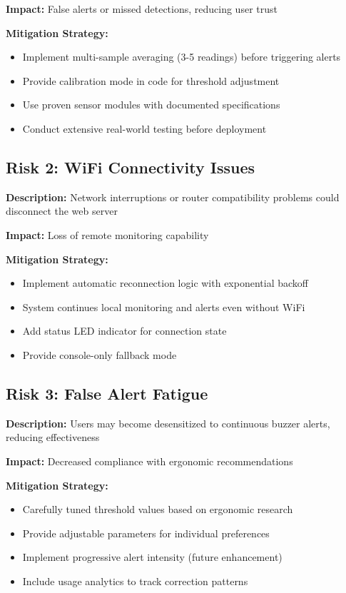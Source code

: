 \documentclass[12pt,a4paper]{article}
\begin{document}
\textbf{Impact:} False alerts or missed detections, reducing user trust

\textbf{Mitigation Strategy:}
\begin{itemize}
\item Implement multi-sample averaging (3-5 readings) before triggering alerts
\item Provide calibration mode in code for threshold adjustment
\item Use proven sensor modules with documented specifications
\item Conduct extensive real-world testing before deployment
\end{itemize}

\subsection{Risk 2: WiFi Connectivity Issues}

\textbf{Description:} Network interruptions or router compatibility problems could disconnect the web server

\textbf{Impact:} Loss of remote monitoring capability

\textbf{Mitigation Strategy:}
\begin{itemize}
\item Implement automatic reconnection logic with exponential backoff
\item System continues local monitoring and alerts even without WiFi
\item Add status LED indicator for connection state
\item Provide console-only fallback mode
\end{itemize}

\subsection{Risk 3: False Alert Fatigue}

\textbf{Description:} Users may become desensitized to continuous buzzer alerts, reducing effectiveness

\textbf{Impact:} Decreased compliance with ergonomic recommendations

\textbf{Mitigation Strategy:}
\begin{itemize}
\item Carefully tuned threshold values based on ergonomic research
\item Provide adjustable parameters for individual preferences
\item Implement progressive alert intensity (future enhancement)
\item Include usage analytics to track correction patterns
\end{itemize}
\end{document}
